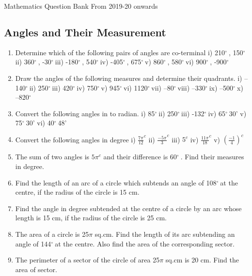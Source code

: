 \documentclass[14pt]{article}
\newcommand{\degree}{$^{\circ}\ $} %
\begin{document}
\centering Mathematics Question Bank From 2019-20 onwards
\begin{multicols}{2}

\section{Angles and Their Measurement}
\noindent
\begin{enumerate}
  
\item Determine which of the following pairs
of angles are co-terminal i) 210\degree, 150\degree
ii) 360\degree, -30\degree iii) -180\degree, 540\degree iv) -405\degree, 675\degree v) 860\degree, 580\degree vi) 900\degree, -900\degree 
\item Draw the angles of the following measures
and determine their quadrants. i) –140\degree  ii) 250\degree iii) 420\degree iv) 750\degree v) 945\degree vi) 1120\degree vii) –80\degree viii) –330\degree ix) –500\degree x) –820\degree

\item Convert the following angles in to radian. i) 85\degree ii) 250\degree iii) -132\degree iv) 65\degree30' v) 75\degree30' vi) 40\degree48'

\item Convert the following angles in degree 
i) $ \frac{7\pi}{12} ^c $
ii) $ \frac{-5\pi}{3} ^c $
iii) $ 5^c $
iv) $ \frac{11\pi}{18} ^c $
v) $ \left( \frac{-1}{4}\right)^c $

\item The sum of two angles is $5\pi^c$ and their
difference is 60\degree. Find their measures in
degree.

\item Find the length of an arc of a circle
which subtends an angle of 108\degree at the
centre, if the radius of the circle is 15
cm.

\item Find the angle in degree subtended at
the centre of a circle by an arc whose
length is 15 cm, if the radius of the
circle is 25 cm.

\item The area of a circle is 25$\pi$ sq.cm. Find
the length of its arc subtending an angle
of 144\degree at the centre. Also find the area
of the corresponding sector.

\item The perimeter of a sector of the circle
of area 25$\pi$ sq.cm is 20 cm. Find the
area of sector.


\end{enumerate}
\end{multicols}
\end{document}
